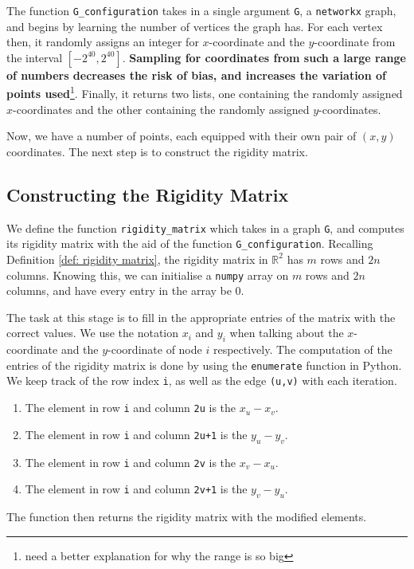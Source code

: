\begin{flushleft}
The function \texttt{G\_configuration} takes in a single argument \texttt{G}, a \texttt{networkx} graph, and begins by learning the number of vertices the graph has. For each vertex then, it randomly assigns an integer for $x$-coordinate and the $y$-coordinate from the interval $[-2^{40}, 2^{40}]$. \textbf{Sampling for coordinates from such a large range of numbers decreases the risk of bias, and increases the variation of points used}\footnote{need a better explanation for why the range is so big}. Finally, it returns two lists, one containing the randomly assigned $x$-coordinates and the other containing the randomly assigned $y$-coordinates.
\end{flushleft}

\begin{flushleft}
Now, we have a number of points, each equipped with their own pair of $(x,y)$ coordinates. The next step is to construct the rigidity matrix.
\end{flushleft}

\subsection{Constructing the Rigidity Matrix}

\begin{flushleft}
We define the function \texttt{rigidity\_matrix} which takes in a graph \texttt{G}, and computes its rigidity matrix with the aid of the function \texttt{G\_configuration}. Recalling Definition \ref{def: rigidity matrix}, the rigidity matrix in $\mathbb{R}^2$ has $m$ rows and $2n$ columns. Knowing this, we can initialise a \texttt{numpy} array on $m$ rows and $2n$ columns, and have every entry in the array be 0.
\end{flushleft}

\begin{flushleft}
The task at this stage is to fill in the appropriate entries of the matrix with the correct values. We use the notation $x_i$ and $y_i$ when talking about the $x$-coordinate and the $y$-coordinate of node $i$ respectively. The computation of the entries of the rigidity matrix is done by using the \texttt{enumerate} function in Python. We keep track of the row index \texttt{i}, as well as the edge \texttt{(u,v)} with each iteration.
\begin{enumerate}
    \item The element in row \texttt{i} and column \texttt{2u} is the $x_u - x_v$.
    \vspace{-3mm}
    \item The element in row \texttt{i} and column \texttt{2u+1} is the $y_u - y_v$.
    \vspace{-3mm}
    \item The element in row \texttt{i} and column \texttt{2v} is the $x_v - x_u$.
    \vspace{-3mm}
    \item The element in row \texttt{i} and column \texttt{2v+1} is the $y_v - y_u$.
\end{enumerate}
The function then returns the rigidity matrix with the modified elements. 
\end{flushleft}

